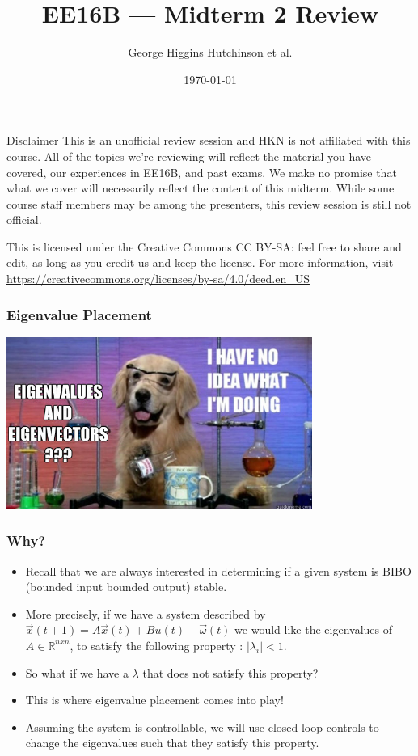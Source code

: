 \documentclass{beamer}
\title{EE16B --- Midterm 2 Review}
\author{George Higgins Hutchinson et al.}
\date{\today}
\newcommand{\R}{\mathbb{R}}
\begin{document}
	\begin{frame}
		\titlepage
	\end{frame}

	\begin{frame}{Disclaimer}
	This is an unofficial review session and HKN is not affiliated with this course. All of the topics we're reviewing will reflect the material you have covered, our experiences in EE16B, and past exams. We make no promise that what we cover will necessarily reflect the content of this midterm. While some course staff members may be among the presenters, this review session is still not official.
	\vspace{1em}
	
	This is licensed under the Creative Commons CC BY-SA: feel free to share and edit, as long as you credit us and keep the license. For more information, visit \\ \small{\url{https://creativecommons.org/licenses/by-sa/4.0/deed.en_US}}
	
	\end{frame}

	\begin{frame}
		\frametitle{Eigenvalue Placement} 
  		\centering\includegraphics[width = 10cm]{eigenvalue.jpg}
	\end{frame}

	\begin{frame}
	\frametitle{Why?} 
		\begin{itemize}
		    \item Recall that we are always interested in determining if a given system is BIBO (bounded input bounded output) stable. 
		    \item More precisely, if we have a system described by $\vec{x}(t+1) = A\vec{x}(t) + Bu(t) + \vec{\omega}(t)$ we would like the eigenvalues of $A \in \R^{nxn}$, to satisfy the following property : $|\lambda_i| < 1$. 
		    \item So what if we have a $\lambda$ that does not satisfy this property?
		    \item This is where eigenvalue placement comes into play!
		    \item Assuming the system is controllable, we will use closed loop controls to change the eigenvalues such that they satisfy this property. 
		\end{itemize}
	\end{frame}
\end{document}
